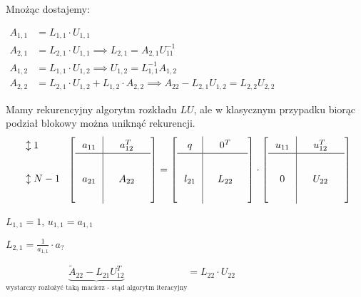 \documentclass[hidelinks,a4paper,fleqn,oneside]{book}
\begin{document}
Mnożąc dostajemy:

$
\begin{array}{ll}
	A_{1,1} & = L_{1,1} \cdot U_{1,1}                                                                           \\
	A_{2,1} & = L_{2,1} \cdot U_{1,1} \implies L_{2,1} = A_{2,1}U_{11}^{-1}                                     \\
	A_{1,2} & = L_{1,1} \cdot U_{1,2}  \implies U_{1,2} = L^{-1}_{1,1} A_{1,2}                                  \\
	A_{2,2} & = L_{2,1} \cdot U_{1,2} + L_{1,2} \cdot A_{2,2} \implies A_{22} - L_{2,1}U_{1,2} = L_{2,2}U_{2,2} 
\end{array}
$

Mamy rekurencyjny algorytm rozkładu $LU$, ale w klasycznym przypadku biorąc podział blokowy można uniknąć rekurencji. 
\[\arraycolsep=0.7em\def\arraystretch{1.4}
	\begin{array}{l}
		\updownarrow 1   \\ \\
		\updownarrow N-1 \\ \ 
	\end{array}
	\left[
		\begin{array}{c|c}
			a_{11} & \quad a_{12}^T \quad \\ \hline & \\
			a_{21} & A_{22}               \\ &
		\end{array}
	\right] =
	\left[
		\begin{array}{c|c}
			q      & \quad 0^T \quad \\ \hline & \\
			l_{21} & L_{22}          \\ &
		\end{array}
	\right]
	\cdot 
	\left[
		\begin{array}{c|c}
			u_{11} & \quad u_{12}^T \quad \\ \hline & \\
			0      & U_{22}               \\ &
		\end{array}
	\right]
\]

$L_{1,1} = 1$, $u_{1,1} = a_{1,1}$

$L_{2,1} = \frac{1}{a_{1,1}} \cdot a_{?}$

$\underbrace{\tilde{A}_{22} - L_{21}U_{12}^T}_{\textrm{wystarczy rozłożyć taką macierz - stąd algorytm iteracyjny}} = L_{22} \cdot U_{22}$
\end{document}
